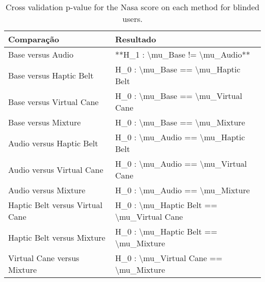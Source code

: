 
\begin{table}[!htb]
\centering
\caption{Cross validation p-value for the Nasa score on each method for blinded users.}
\label{tab:lsd_nasa}
\begin{tabular}{ll}
\toprule
                     Comparação &                                 Resultado \\
\midrule
              Base versus Audio &           **H\_1 : \textbackslash mu\_Base != \textbackslash mu\_Audio** \\
        Base versus Haptic Belt &         H\_0 : \textbackslash mu\_Base == \textbackslash mu\_Haptic Belt \\
       Base versus Virtual Cane &        H\_0 : \textbackslash mu\_Base == \textbackslash mu\_Virtual Cane \\
            Base versus Mixture &             H\_0 : \textbackslash mu\_Base == \textbackslash mu\_Mixture \\
       Audio versus Haptic Belt &        H\_0 : \textbackslash mu\_Audio == \textbackslash mu\_Haptic Belt \\
      Audio versus Virtual Cane &       H\_0 : \textbackslash mu\_Audio == \textbackslash mu\_Virtual Cane \\
           Audio versus Mixture &            H\_0 : \textbackslash mu\_Audio == \textbackslash mu\_Mixture \\
Haptic Belt versus Virtual Cane & H\_0 : \textbackslash mu\_Haptic Belt == \textbackslash mu\_Virtual Cane \\
     Haptic Belt versus Mixture &      H\_0 : \textbackslash mu\_Haptic Belt == \textbackslash mu\_Mixture \\
    Virtual Cane versus Mixture &     H\_0 : \textbackslash mu\_Virtual Cane == \textbackslash mu\_Mixture \\
\bottomrule
\end{tabular}
\end{table}

